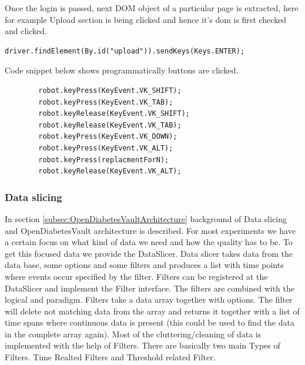 \documentclass[article,type=msc,colorback,accentcolor=tud9c,twoside,11pt]{tudthesis}
\begin{document}
Once the login is passed, next DOM object of a particular page is extracted, here for example Upload section is being clicked and hence it's dom is first checked and clicked.
\begin{lstlisting}
driver.findElement(By.id("upload")).sendKeys(Keys.ENTER);
\end{lstlisting}
 Code snippet below shows programmatically buttons are clicked.
\begin{lstlisting}
		robot.keyPress(KeyEvent.VK_SHIFT);
		robot.keyPress(KeyEvent.VK_TAB);
		robot.keyRelease(KeyEvent.VK_SHIFT);
		robot.keyRelease(KeyEvent.VK_TAB);
		robot.keyPress(KeyEvent.VK_DOWN);
		robot.keyPress(KeyEvent.VK_ALT);
		robot.keyPress(replacmentForN);
		robot.keyRelease(KeyEvent.VK_ALT);	
\end{lstlisting}


\subsubsection{Data slicing}
In section \ref{subsec:OpenDiabetesVaultArchitecture} background of Data slicing and OpenDiabetesVault architecture is described. For most experiments we have a certain focus on what kind of data we need and how the quality has to be. To get this focused data we provide the DataSlicer. Data slicer takes data from the data base, some options and some filters and produces a list with time points where events occur specified by the filter. Filters can be registered at the DataSlicer and implement the Filter interface. The filters are combined with the logical and paradigm. Filters take a data array together with options. The filter will delete not matching data from the array and returns it together with a list of time spans where continuous data is present (this could be used to find the data in the complete array again).  Most of the cluttering/cleaning of data is implemented with the help of Filters. There are basically two main Types of Filters. Time Realted Filters and Threshold related Filter.
\end{document}
